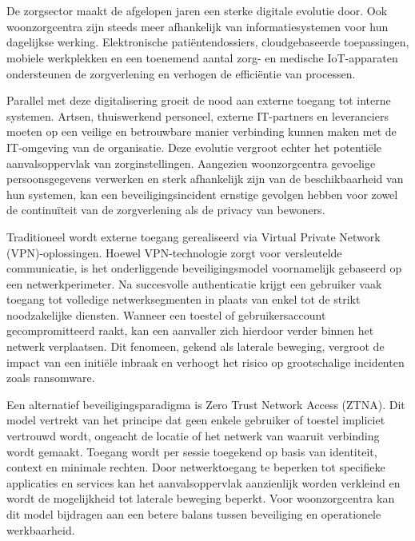 
\chapter{}%
\label{ch:inleiding}

De zorgsector maakt de afgelopen jaren een sterke digitale evolutie door. Ook woonzorgcentra zijn steeds meer afhankelijk van informatiesystemen voor hun dagelijkse werking. Elektronische patiëntendossiers, cloudgebaseerde toepassingen, mobiele werkplekken en een toenemend aantal zorg- en medische IoT-apparaten ondersteunen de zorgverlening en verhogen de efficiëntie van processen.

Parallel met deze digitalisering groeit de nood aan externe toegang tot interne systemen. Artsen, thuiswerkend personeel, externe IT-partners en leveranciers moeten op een veilige en betrouwbare manier verbinding kunnen maken met de IT-omgeving van de organisatie. Deze evolutie vergroot echter het potentiële aanvalsoppervlak van zorginstellingen. Aangezien woonzorgcentra gevoelige persoonsgegevens verwerken en sterk afhankelijk zijn van de beschikbaarheid van hun systemen, kan een beveiligingsincident ernstige gevolgen hebben voor zowel de continuïteit van de zorgverlening als de privacy van bewoners.

Traditioneel wordt externe toegang gerealiseerd via Virtual Private Network (VPN)-oplossingen. Hoewel VPN-technologie zorgt voor versleutelde communicatie, is het onderliggende beveiligingsmodel voornamelijk gebaseerd op een netwerkperimeter. Na succesvolle authenticatie krijgt een gebruiker vaak toegang tot volledige netwerksegmenten in plaats van enkel tot de strikt noodzakelijke diensten. Wanneer een toestel of gebruikersaccount gecompromitteerd raakt, kan een aanvaller zich hierdoor verder binnen het netwerk verplaatsen. Dit fenomeen, gekend als laterale beweging, vergroot de impact van een initiële inbraak en verhoogt het risico op grootschalige incidenten zoals ransomware.

Een alternatief beveiligingsparadigma is Zero Trust Network Access (ZTNA). Dit model vertrekt van het principe dat geen enkele gebruiker of toestel impliciet vertrouwd wordt, ongeacht de locatie of het netwerk van waaruit verbinding wordt gemaakt. Toegang wordt per sessie toegekend op basis van identiteit, context en minimale rechten. Door netwerktoegang te beperken tot specifieke applicaties en services kan het aanvalsoppervlak aanzienlijk worden verkleind en wordt de mogelijkheid tot laterale beweging beperkt. Voor woonzorgcentra kan dit model bijdragen aan een betere balans tussen beveiliging en operationele werkbaarheid.

